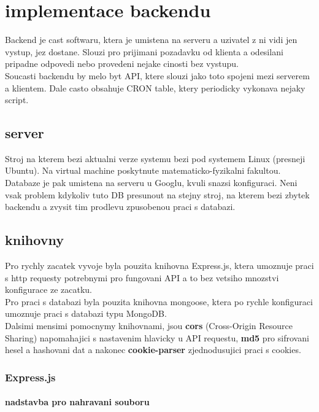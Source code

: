 \chapter{implementace backendu}
Backend je cast softwaru, ktera je umistena na serveru a uzivatel
z ni vidi jen vystup, jez dostane. Slouzi pro prijimani pozadavku od
klienta a odesilani pripadne odpovedi nebo provedeni nejake cinosti bez vystupu. 
\\
Soucasti backendu by melo byt API, ktere slouzi jako toto spojeni mezi
serverem a klientem. Dale casto obsahuje CRON table, ktery periodicky
vykonava nejaky script.

\section{server}
Stroj na kterem bezi aktualni verze systemu bezi pod systemem Linux (presneji Ubuntu).
Na virtual machine poskytnute matematicko-fyzikalni fakultou.
\\
Databaze je pak umistena na serveru u Googlu, kvuli snazsi konfiguraci.
Neni vsak problem kdykoliv tuto DB presunout na stejny stroj, na kterem bezi
zbytek backendu a zvysit tim prodlevu zpusobenou praci s databazi.


\section{knihovny}
Pro rychly zacatek vyvoje byla pouzita knihovna Express.js, ktera
umoznuje praci s http requesty potrebnymi pro fungovani API a to 
bez vetsiho mnozstvi konfigurace ze zacatku.
\\
Pro praci s databazi byla pouzita knihovna mongoose, ktera po rychle konfiguraci
umoznuje praci s databazi typu MongoDB.
\\
Dalsimi mensimi pomocnymy knihovnami, jsou
\textbf{cors} (Cross-Origin Resource Sharing) napomahajici s nastavenim hlavicky u API requestu,
\textbf{md5} pro sifrovani hesel a hashovani dat a nakonec
\textbf{cookie-parser} zjednodusujici praci s cookies.

\subsection{Express.js}


\subsubsection{nadstavba pro nahravani souboru}


